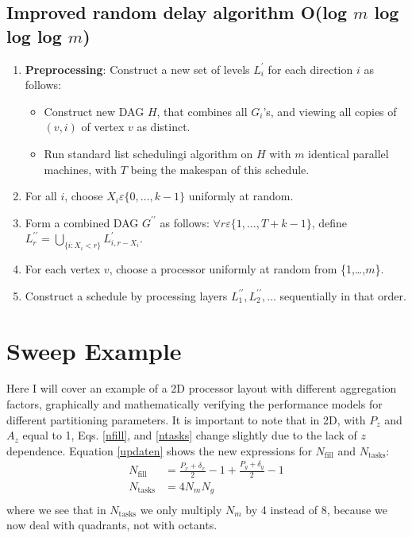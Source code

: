 \documentclass[11pt, letterpaper,titlepage,oneside]{article}
\begin{document}
\subsection*{Improved random delay algorithm O(log $m$ log log log $m$)}
\begin{enumerate}
\item \textbf{Preprocessing}: Construct a new set of levels $L_i^{\prime}$ for each direction $i$ as follows:
\begin{itemize}
\item Construct new DAG $H$, that combines all $G_i$'s, and viewing all copies of $(v,i)$ of vertex $v$ as distinct.
\item Run standard list schedulingi algorithm on $H$ with $m$ identical parallel machines, with $T$ being the makespan of this schedule.
\end{itemize}
\item For all $i$, choose $X_i \varepsilon \{0,\ldots,k-1\}$ uniformly at random.
\item Form a combined DAG $G^{\prime\prime}$ as follows: $\forall r \varepsilon \{1,\ldots,T+k-1\}$, define $L_r^{\prime\prime} = \bigcup_{\{i:X_i<r\}}L^\prime_{i,r-X_i}$.
\item For each vertex $v$, choose a processor uniformly at random from \{1,\ldots,$m$\}.
\item Construct a schedule by processing layers $L_1^{\prime\prime},L_2^{\prime\prime},\ldots$ sequentially in that order.
\end{enumerate}

\newpage

\section*{Sweep Example}

Here I will cover an example of a 2D processor layout with different aggregation factors, graphically and mathematically verifying the performance models for different partitioning parameters. It is important to note that in 2D, with $P_z$ and $A_z$ equal to 1, Eqs. \ref{nfill}, and \ref{ntasks} change slightly due to the lack of $z$ dependence. Equation \ref{updaten} shows the new expressions for $N_{\text{fill}}$ and $N_{\text{tasks}}$:
\begin{align}
N_{\text{fill}} &= \frac{P_x + \delta_x}{2} - 1 + \frac{P_y + \delta_y}{2} - 1 \\
N_{\text{tasks}} &= 4 N_m N_g\\
\label{updaten}
\end{align}
where we see that in $N_{\text{tasks}}$ we only multiply $N_m$ by 4 instead of 8, because we now deal with quadrants, not with octants.

%



\end{document}
